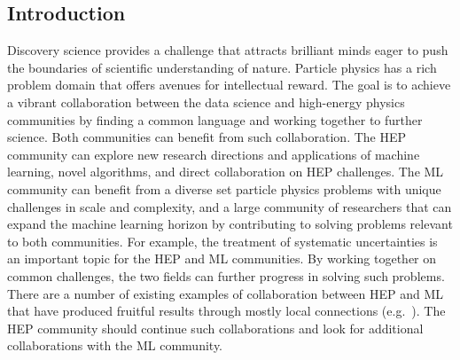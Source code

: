 

\subsection{Introduction}


Discovery science provides a challenge that attracts brilliant minds eager to push the boundaries of scientific understanding of nature. Particle physics has a rich problem domain that offers avenues for intellectual reward. The goal is to achieve a vibrant collaboration between the data science and high-energy physics communities by finding a common language and working together to further science.
Both communities can benefit from such collaboration. The HEP community can explore new research directions and applications of machine learning, novel algorithms, and direct collaboration on HEP challenges. The ML community can benefit from a diverse set particle physics problems with unique challenges in scale and complexity, and a large community of researchers that can expand the machine learning horizon by contributing to solving problems relevant to both communities. For example, the treatment of systematic uncertainties is an important topic for the HEP and ML communities. By working together on common challenges, the two fields can further progress in solving such problems.\\

There are a number of existing examples of collaboration between HEP and ML that have produced fruitful results through mostly local connections (e.g.~\cite{Likhomanenko:2016tgu,Paganini:2017hrr}). The HEP community should continue such collaborations and look for additional collaborations with the ML community.\\

